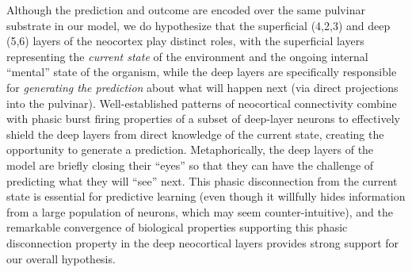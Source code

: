 \documentclass[11pt,twoside]{article}
\newif\myifpdf
\begin{document}
\begin{itemize}
Although the prediction and outcome are encoded over the same pulvinar substrate in our model, we do hypothesize that the superficial (4,2,3) and deep (5,6) layers of the neocortex play distinct roles, with the superficial layers representing the {\em current state} of the environment and the ongoing internal ``mental'' state of the organism, while the deep layers are specifically responsible for {\em generating the prediction} about what will happen next (via direct projections into the pulvinar).  Well-established patterns of neocortical connectivity combine with phasic burst firing properties of a subset of deep-layer neurons to effectively shield the deep layers from direct knowledge of the current state, creating the opportunity to generate a prediction.  Metaphorically, the deep layers of the model are briefly closing their ``eyes'' so that they can have the challenge of predicting what they will ``see'' next.  This phasic disconnection from the current state is essential for predictive learning (even though it willfully hides information from a large population of neurons, which may seem counter-intuitive), and the remarkable convergence of biological properties supporting this phasic disconnection property in the deep neocortical layers provides strong support for our overall hypothesis.


\end{itemize}
\end{document}
